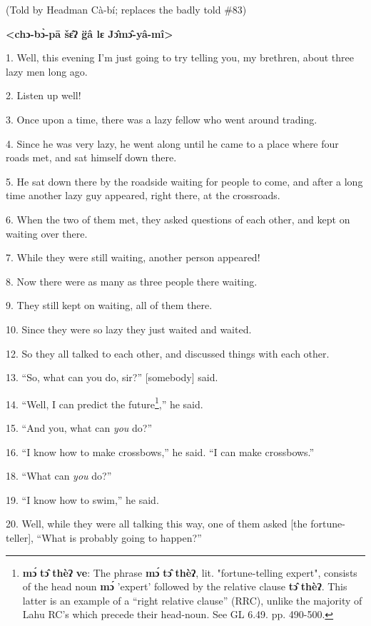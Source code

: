 \setcounter{footnote}{0}

(Told by Headman Cà-bí; replaces the badly told \#83)

\textbf{<chɔ-bɔ̀-pā šɛ̂ʔ g̈â lɛ Jɔ̂mɔ̂-yâ-mî>}

1. Well, this evening I'm just going to try telling you, my brethren, about three
lazy men long ago.

2. Listen up well!

3. Once upon a time, there was a lazy fellow who went around trading.

4. Since he was very lazy, he went along until he came to a place where four roads
met, and sat himself down there.

5. He sat down there by the roadside waiting for people to come, and after a long
time another lazy guy appeared, right there, at the crossroads.

6. When the two of them met, they asked questions of each other, and kept on waiting
over there.

7. While they were still waiting, another person appeared!

8. Now there were as many as three people there waiting.

9. They still kept on waiting, all of them there.

10. Since they were so lazy they just waited and waited.

12. So they all talked to each other, and discussed things with each other.

13. ``So, what can you do, sir?'' [somebody] said.

14. ``Well, I can predict the future\footnote{\textbf{mɔ́} \textbf{tɔ̂} \textbf{thèʔ} \textbf{ve}: The phrase \textbf{mɔ́} \textbf{tɔ̂} \textbf{thèʔ}, lit. "fortune-telling expert", consists of the head noun \textbf{mɔ́} 'expert' followed by the relative clause \textbf{tɔ̂} \textbf{thèʔ}. This latter is an example of a ``right relative clause'' (RRC), unlike the majority of Lahu RC's which precede their head-noun. See GL 6.49. pp. 490-500.},'' he said.

15. ``And you, what can \textit{you} do?''

16. ``I know how to make crossbows,'' he said. ``I can make crossbows.''

18. ``What can \textit{you} do?''

19. ``I know how to swim,'' he said.

20. Well, while they were all talking this way, one of them asked [the fortune-teller],
``What is probably going to happen?''

